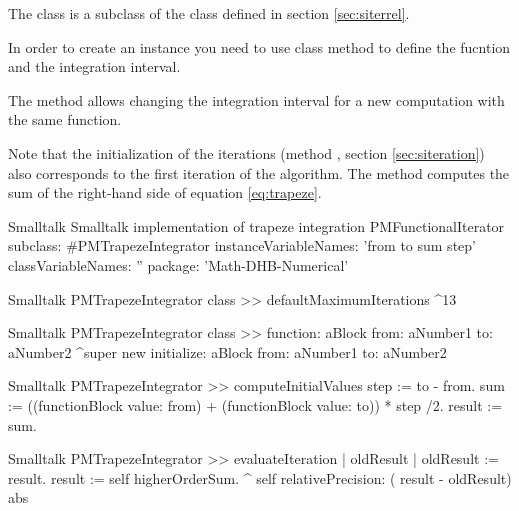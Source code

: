 The class  is a subclass of the class
 defined in section
\ref{sec:siterrel}.

In order to create an instance you need to use class method  to define the fucntion and the integration interval.


The method  allows changing the integration interval
for a new computation with the same function.

Note that the initialization of the iterations (method , \cf section \ref{sec:siteration}) also corresponds to the first iteration of the algorithm.
The method  computes the sum of the right-hand side of equation \ref{eq:trapeze}.

\begin{listing}[label=lst:trapeze]{Smalltalk}
{Smalltalk implementation of trapeze integration}
PMFunctionalIterator subclass: #PMTrapezeIntegrator
   instanceVariableNames: 'from to sum step'
   classVariableNames: ''
   package: 'Math-DHB-Numerical'
\end{listing}

\begin{displaycode}{Smalltalk}
PMTrapezeIntegrator class >> defaultMaximumIterations
    ^13
\end{displaycode}

\begin{displaycode}{Smalltalk}
PMTrapezeIntegrator class >> function: aBlock from: aNumber1 to: aNumber2
    ^super new initialize: aBlock from: aNumber1 to: aNumber2
\end{displaycode}

\begin{displaycode}{Smalltalk}
PMTrapezeIntegrator >> computeInitialValues
    step := to - from.
    sum := ((functionBlock value: from) + (functionBlock value: to)) * step /2.
    result := sum.
\end{displaycode}

\begin{displaycode}{Smalltalk}
PMTrapezeIntegrator >> evaluateIteration
    | oldResult |
    oldResult := result.
    result := self higherOrderSum.
    ^ self relativePrecision: ( result - oldResult) abs
\end{displaycode}

